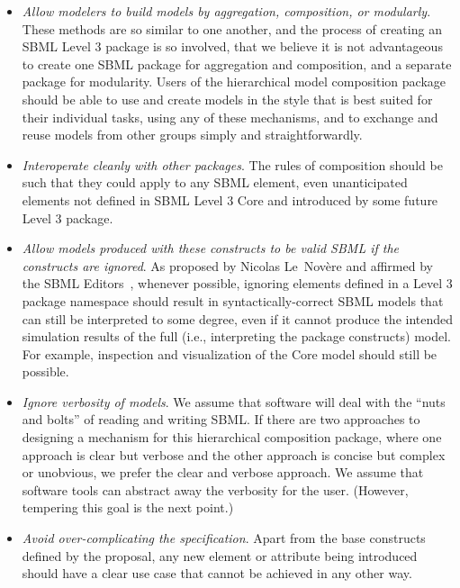 \begin{itemize}

\item \emph{Allow modelers to build models by aggregation, composition,
    or modularly}.  These methods are so similar to one another, and the
  process of creating an SBML Level 3 package is so involved, that we
  believe it is not advantageous to create one SBML package for
  aggregation and composition, and a separate package for modularity.
  Users of the hierarchical model composition package should be able to
  use and create models in the style that is best suited for their
  individual tasks, using any of these mechanisms, and to exchange and
  reuse models from other groups simply and straightforwardly.

\item \emph{Interoperate cleanly with other packages}. The rules of
  composition should be such that they could apply to any SBML element,
  even unanticipated elements not defined in SBML Level 3 Core and
  introduced by some future Level 3 package.

\item \emph{Allow models produced with these constructs to be valid SBML
    if the constructs are ignored}.  As proposed by Nicolas
  Le~Nov\`{e}re and affirmed by the SBML Editors~\cite{x}, whenever
  possible, ignoring elements defined in a Level 3 package namespace
  should result in syntactically-correct SBML models that can still be
  interpreted to some degree, even if it cannot produce the intended
  simulation results of the full (i.e., interpreting the package
  constructs) model.  For example, inspection and visualization of the
  Core model should still be possible.

\item \emph{Ignore verbosity of models}. We assume that software will
  deal with the ``nuts and bolts'' of reading and writing SBML.  If
  there are two approaches to designing a mechanism for this
  hierarchical composition package, where one approach is clear but
  verbose and the other approach is concise but complex or unobvious, we
  prefer the clear and verbose approach.  We assume that software tools
  can abstract away the verbosity for the user.  (However, tempering
  this goal is the next point.)

\item \emph{Avoid over-complicating the specification}. Apart from the
  base constructs defined by the proposal, any new element or attribute
  being introduced should have a clear use case that cannot be achieved
  in any other way.  


\end{itemize}
